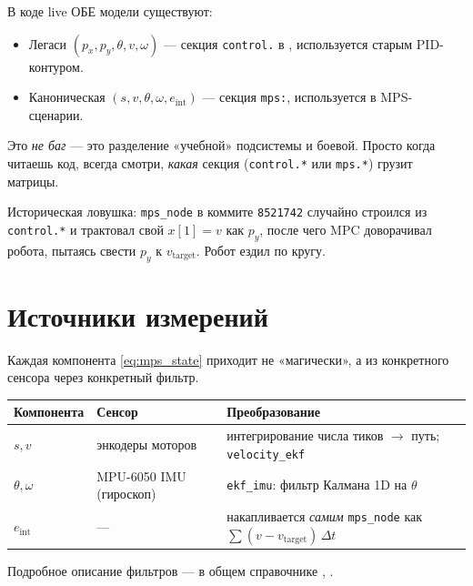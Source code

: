 \begin{warnbox}
В коде live ОБЕ модели существуют:
\begin{itemize}
  \item Легаси $(p_x, p_y, \theta, v, \omega)$ --- секция \texttt{control.}
        в , используется старым PID-контуром.
  \item Каноническая $(s, v, \theta, \omega, e_\text{int})$ --- секция
        \texttt{mps:}, используется в MPS-сценарии.
\end{itemize}
Это \emph{не баг} --- это разделение «учебной» подсистемы и боевой.
Просто когда читаешь код, всегда смотри, \emph{какая} секция
(\texttt{control.*} или \texttt{mps.*}) грузит матрицы.

Историческая ловушка: \texttt{mps\_node} в коммите \texttt{8521742}
случайно строился из \texttt{control.*} и трактовал свой
$x[1] = v$ как $p_y$, после чего MPC доворачивал робота, пытаясь
свести $p_y$ к $v_\text{target}$. Робот ездил по кругу.
\end{warnbox}

\section{Источники измерений}

Каждая компонента \eqref{eq:mps_state} приходит не «магически», а из
конкретного сенсора через конкретный фильтр.

\begin{center}
\begin{tabular}{llp{6cm}}
\toprule
\textbf{Компонента} & \textbf{Сенсор} & \textbf{Преобразование}\\
\midrule
$s, v$    & энкодеры моторов   & интегрирование числа тиков $\to$ путь;
                                 \texttt{velocity\_ekf}\\
$\theta, \omega$ & MPU-6050 IMU (гироскоп) & \texttt{ekf\_imu}: фильтр Калмана
                                            1D на $\theta$\\
$e_\text{int}$ & --- & накапливается \emph{самим} \texttt{mps\_node} как
                       $\sum (v - v_\text{target})\,\Delta t$\\
\bottomrule
\end{tabular}
\end{center}

Подробное описание фильтров --- в общем справочнике
,
.

